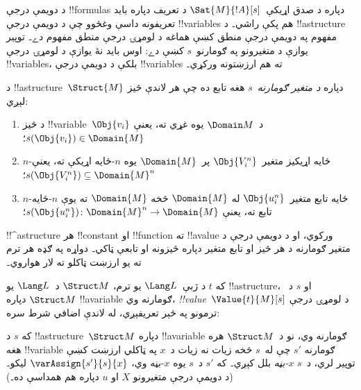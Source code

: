 \documentclass[../../../include/open-logic-section]{subfiles}
\begin{document}


\begin{explain}
د دويمې درجې !!{formula}s دپاره د صدق اړيکې~$\Sat{M}{!A}[s]$ د
تعريف دپاره بايد تعريفونه داسې وغځوو چې د دويمې درجې !!{variable}s
هم پکې راشي۔ د !!a{structure} مفهوم په دويمې درجې منطق کښې هماغه
د لومړۍ درجې منطق مفهوم دے۔ توپير يوازې د متغيرونو په
ګومارنو~$s$ کښې دے: اوس بايد نۀ يوازې د لومړۍ درجې !!{variable}s،
بلکې د دويمې درجې !!{variable}s ته هم ارزښتونه ورکړي۔
\end{explain}

\begin{defn}
د !!a{structure}~$\Struct{M}$ دپاره \emph{د متغير ګومارنه}~$s$
هغه تابع ده چې هر لاندې څيز لېږي:
\begin{enumerate}
\item د څيز !!{variable}~$\Obj{v_i}$ د~$\Domain M$ يوه غړي ته،
  يعنې $s(\Obj{v_i}) \in \Domain{M}$؛
\item $n$-ځايه اړيکيز متغير~$\Obj{V_i^n}$ پر~$\Domain{M}$ يوه
  $n$-ځايه اړيکې ته، يعنې $s(\Obj{V_i^n}) \subseteq \Domain{M}^n$؛
\item $n$-ځايه تابع متغير~$\Obj{u_i^n}$ له $\Domain{M}$ څخه
  $\Domain{M}$ ته يوې $n$-ځايه تابع ته، يعنې
  $s(\Obj{u_i^n})\colon \Domain{M}^n \to \Domain{M}$؛
\end{enumerate}
\end{defn}

\begin{explain}
!!^a{structure} هر !!{constant} او !!{function} ته !!a{value}
ورکوي، او د دويمې درجې د متغير ګومارنه د هر څيز او تابع متغير دپاره
څيزونه او تابعې ټاکي۔ دواړه په ګډه هر ترم ته يو ارزښت ټاکلو ته لار
هواروي۔
\end{explain}

\begin{defn}
که $t$ د ژبې~$\Lang L$ يو ترم، $\Struct M$ د~$\Lang L$ يو
!!a{structure}، او $s$ د~$\Struct M$ دپاره !!a{variable} ګومارنه
وي، \emph{!!{value}}~$\Value{t}{M}[s]$ د لومړۍ درجې ترمونو په څېر
تعريفېږي، له لاندې اضافي شرط سره:
\begin{quote}
\end{quote}
\end{defn}

\begin{defn}[$x$-بڼه]
که $s$ د !!a{structure}~$\Struct M$ دپاره !!a{variable} ګومارنه
وي، نو د~$\Struct M$ هره هغه !!{variable} ګومارنه $s'$ چې له~$s$
څخه زيات نه زيات د~$x$ په ټاکلي ارزښت کښې توپير لري، د~$s$
\emph{$x$-بڼه} بلل کېږي۔ که $s'$ د~$s$ يوه $x$-بڼه وي،
$\varAssign{s'}{s}{x}$ ليکو۔ (د دويمې درجې متغيرونو $X$ او $u$
دپاره هم همداسې ده۔)
\end{defn}
\end{document}
